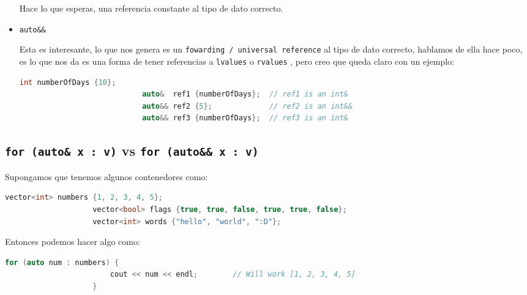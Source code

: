 \documentclass[12pt, fleqn]{report}                             %
\theoremstyle{break}                                            %
\newcommand{\textCode}[1]  { \texttt{#1} }                      %
\begin{document}
\begin{itemize}
                        Hace lo que esperas, una referencia constante al tipo de dato correcto.

                    \item \textCode{auto\&\&}
                    
                        Esta es interesante, lo que nos genera es un \textCode{fowarding / universal reference}
                        al tipo de dato correcto, hablamos de ella hace poco, es lo que nos da es una 
                        forma de tener referencias a \textCode{lvalues} o \textCode{rvalues}, pero creo 
                        que queda claro con un ejemplo:
                        \begin{lstlisting}[language=C++, gobble=28]
                            int numberOfDays {10};
                            auto&  ref1 {numberOfDays};  // ref1 is an int&
                            auto&& ref2 {5};             // ref2 is an int&&
                            auto&& ref3 {numberOfDays};  // ref3 is an int&
                        \end{lstlisting}

                \end{itemize}

     
            \clearpage
            \subsection{ \textCode{for (auto\& x : v)} vs \textCode{for (auto\&\& x : v)} } 
            
                Supongamos que tenemos algunos contenedores como:
                \begin{lstlisting}[language=C++, gobble=20]
                    vector<int> numbers {1, 2, 3, 4, 5};
                    vector<bool> flags {true, true, false, true, true, false};
                    vector<int> words {"hello", "world", ":D"};
                \end{lstlisting}

                Entonces podemos hacer algo como:
                \begin{lstlisting}[language=C++, gobble=20]
                    for (auto num : numbers) {
                        cout << num << endl;        // Will work [1, 2, 3, 4, 5]
                    }
                \end{lstlisting}
\end{document}
